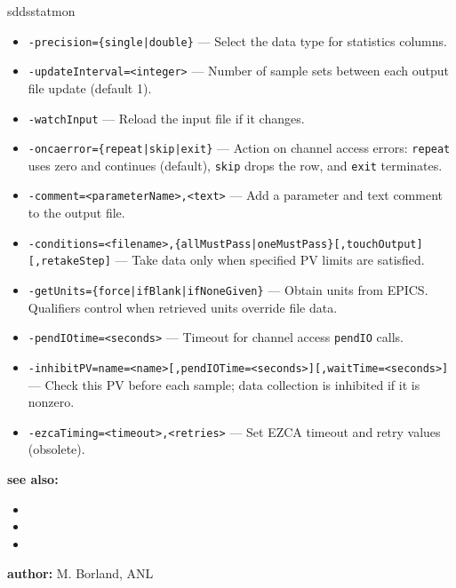 \begin{sddsprog}{sddsstatmon}
\begin{itemize}
        \item {\tt -precision=\{single|double\}} --- Select the data type for statistics columns.
        \item {\tt -updateInterval=<integer>} --- Number of sample sets between each output file update (default 1).
        \item {\tt -watchInput} --- Reload the input file if it changes.
        \item {\tt -oncaerror=\{repeat|skip|exit\}} --- Action on channel access errors: \verb+repeat+ uses zero and continues (default), \verb+skip+ drops the row, and \verb+exit+ terminates.
        \item {\tt -comment=<parameterName>,<text>} --- Add a parameter and text comment to the output file.
        \item {\tt -conditions=<filename>,\{allMustPass|oneMustPass\}[,touchOutput][,retakeStep]} --- Take data only when specified PV limits are satisfied.
        \item {\tt -getUnits=\{force|ifBlank|ifNoneGiven\}} --- Obtain units from EPICS. Qualifiers control when retrieved units override file data.
        \item {\tt -pendIOtime=<seconds>} --- Timeout for channel access \verb+pendIO+ calls.
        \item {\tt -inhibitPV=name=<name>[,pendIOTime=<seconds>][,waitTime=<seconds>]} --- Check this PV before each sample; data collection is inhibited if it is nonzero.
        \item {\tt -ezcaTiming=<timeout>,<retries>} --- Set EZCA timeout and retry values (obsolete).
    \end{itemize}

\item \textbf{see also:}
    \begin{itemize}
    \item {}
    \item {}
    \item {}
    \end{itemize}
\item \textbf{author:} M. Borland, ANL 
\end{sddsprog}
